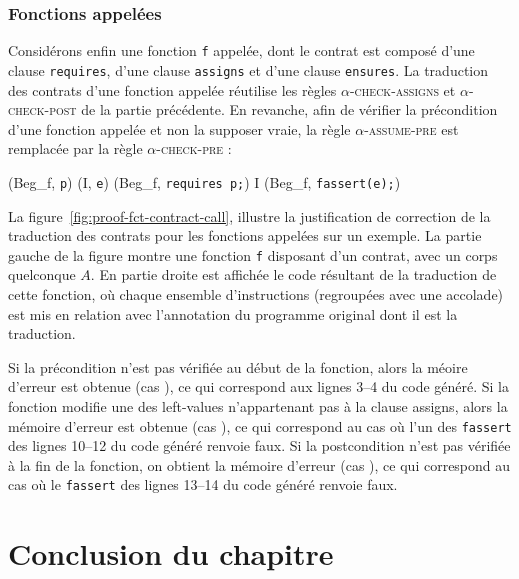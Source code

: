 \subsubsection{Fonctions appelées}



Considérons enfin une fonction \lstinline'f' appelée, dont le contrat est
composé d'une clause \lstinline'requires', d'une clause \lstinline'assigns' et
d'une clause \lstinline'ensures'.
La traduction des contrats d'une fonction appelée réutilise les règles
\textsc{$\alpha$-check-assigns} et \textsc{$\alpha$-check-post} de la partie
précédente.
En revanche, afin de vérifier la précondition d'une fonction appelée et non la
supposer vraie, la règle \textsc{$\alpha$-assume-pre} est remplacée par la règle
\textsc{$\alpha$-check-pre} :

{\scriptsize
  {
    {(Beg_f, \mbox{\lstinline'p'})  (I, \mbox{\lstinline'e'})}
    {(Beg_f, \mbox{\lstinline'requires p;'})
      I \concat (Beg_f, \mbox{\lstinline'fassert(e);'})}{}
  }
}

La figure~\ref{fig:proof-fct-contract-call}, illustre la justification de
correction de la traduction des contrats pour les fonctions appelées sur
un exemple.
La partie gauche de la figure montre une fonction \lstinline'f' disposant d'un
contrat, avec un corps quelconque $A$.
En partie droite est affichée le code résultant de la traduction de cette
fonction, où chaque ensemble d'instructions (regroupées avec une accolade) est
mis en relation avec l'annotation du programme original dont il est la
traduction.

Si la précondition n'est pas vérifiée au début de la fonction, alors
la méoire d'erreur est obtenue (cas ), ce qui correspond aux
lignes 3--4 du code généré.
Si la fonction modifie une des left-values n'appartenant pas à la clause
assigns, alors la mémoire d'erreur est obtenue (cas ), ce qui
correspond au cas où l'un des \lstinline'fassert' des lignes 10--12 du code
généré renvoie faux.
Si la postcondition n'est pas vérifiée à la fin de la fonction, on obtient
la mémoire d'erreur (cas ), ce qui correspond au cas où le
\lstinline'fassert' des lignes 13--14 du code généré renvoie faux.


\section*{Conclusion du chapitre}


